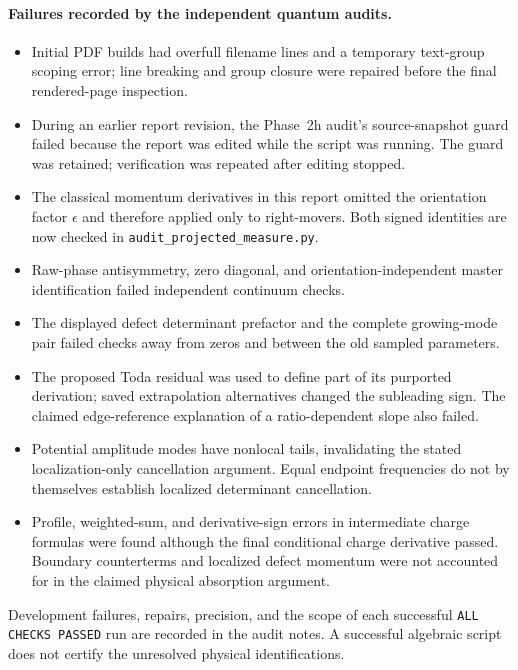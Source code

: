 \documentclass[11pt,a4paper]{article}
\theoremstyle{remark}\newtheorem{remark}[proposition]{Remark}
\begin{document}
\paragraph{Failures recorded by the independent quantum audits.}
\begin{itemize}
\item Initial PDF builds had overfull filename lines and a temporary text-group
scoping error; line breaking and group closure were repaired before the final
rendered-page inspection.
\item During an earlier report revision, the Phase~2h audit's source-snapshot guard
failed because the report was edited while the script was running. The guard
was retained; verification was repeated after editing stopped.
\item The classical momentum derivatives in this report omitted the orientation
factor $\epsilon$ and therefore applied only to right-movers. Both signed
identities are now checked in \texttt{audit\_\allowbreak projected\_\allowbreak measure.py}.
\item Raw-phase antisymmetry, zero diagonal, and orientation-independent
master identification failed independent continuum checks.
\item The displayed defect determinant prefactor and the complete growing-mode
pair failed checks away from zeros and between the old sampled parameters.
\item The proposed Toda residual was used to define part of its purported
derivation; saved extrapolation alternatives changed the subleading sign.
The claimed edge-reference explanation of a ratio-dependent slope also failed.
\item Potential amplitude modes have nonlocal tails, invalidating the stated
localization-only cancellation argument. Equal endpoint frequencies do not
by themselves establish localized determinant cancellation.
\item Profile, weighted-sum, and derivative-sign errors in intermediate
charge formulas were found although the final conditional charge derivative
passed. Boundary counterterms and localized defect momentum were not accounted
for in the claimed physical absorption argument.
\end{itemize}
Development failures, repairs, precision, and the scope of each successful
\texttt{ALL CHECKS PASSED} run are recorded in the audit notes. A successful
algebraic script does not certify the unresolved physical identifications.
\end{document}
